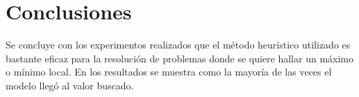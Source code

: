\documentclass{article}
\begin{document}
\section{Conclusiones}
Se concluye con los experimentos realizados que el método heurístico utilizado es bastante eficaz para la resolución de problemas donde se quiere hallar un máximo o mínimo local. En los resultados se muestra como la mayoría de las veces el modelo llegó al valor buscado.



\end{document}
